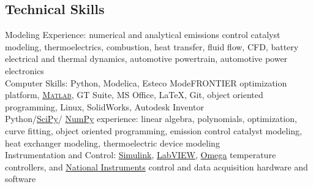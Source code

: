 \documentclass[centered]{res}
\begin{document}
\begin{resume}
\section{Technical Skills}
% 
Modeling Experience: numerical and analytical emissions control
catalyst modeling, thermoelectrics, combustion, heat transfer, fluid
flow, CFD, battery electrical and thermal dynamics, automotive
powertrain, automotive power electronics
\vspace{5pt} \\
Computer Skills: Python, Modelica, Esteco ModeFRONTIER optimization
platform,
\href{http://www.mathworks.com/products/matlab/}{\textsc{Matlab}}, GT
Suite, MS Office, \LaTeX, Git, object oriented programming, Linux,
SolidWorks, Autodesk Inventor
\vspace{5pt} \\
%
Python/\href{http://www.scipy.org/}{SciPy}/%
\href{http://numpy.scipy.org/}{NumPy}
experience: linear algebra, polynomials, optimization, curve fitting,
object oriented programming, emission control catalyst modeling, heat
exchanger modeling, thermoelectric device modeling
\vspace{5pt} \\
%
Instrumentation and Control:
\href{http://www.mathworks.com/products/simulink/}{Simulink},
\href{http://www.ni.com/}{LabVIEW},
\href{http://www.omega.com/}{Omega} temperature controllers, and
\href{http://www.ni.com}{National Instruments} control and data
acquisition hardware and software
%

\end{resume}
\end{document}
